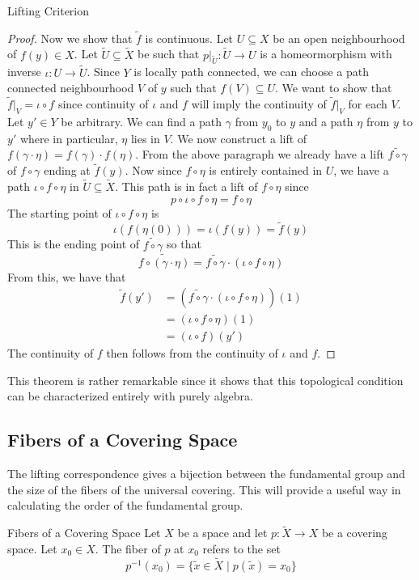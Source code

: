 \documentclass[a4paper]{article}
\begin{document}
\begin{thm}{Lifting Criterion}{}
\begin{proof}
Now we show that $\tilde{f}$ is continuous. Let $U\subseteq X$ be an open neighbourhood of $f(y)\in X$. Let $\tilde{U}\subseteq\tilde{X}$ be such that $p|_{\tilde{U}}:\tilde{U}\to U$ is a homeormorphism with inverse $\iota:U\to\tilde{U}$. Since $Y$ is locally path connected, we can choose a path connected neighbourhood $V$ of $y$ such that $f(V)\subseteq U$. We want to show that $\tilde{f}|_V=\iota\circ f$ since continuity of $\iota$ and $f$ will imply the continuity of $\tilde{f}|_V$ for each $V$. Let $y'\in Y$ be arbitrary. We can find a path $\gamma$ from $y_0$ to $y$ and a path $\eta$ from $y$ to $y'$ where in particular, $\eta$ lies in $V$. We now construct a lift of $f(\gamma\cdot\eta)=f(\gamma)\cdot f(\eta)$. From the above paragraph we already have a lift $\widetilde{f\circ\gamma}$ of $f\circ\gamma$ ending at $\tilde{f}(y)$. Now since $f\circ\eta$ is entirely contained in $U$, we have a path $\iota\circ f\circ\eta$ in $\tilde{U}\subseteq\tilde{X}$. This path is in fact a lift of $f\circ\eta$ since $$p\circ\iota\circ f\circ\eta=f\circ\eta$$ The starting point of $\iota\circ f\circ\eta$ is $$\iota(f(\eta(0)))=\iota(f(y))=\tilde{f}(y)$$ This is the ending point of $\tilde{f\circ\gamma}$ so that $$\widetilde{f\circ(\gamma\cdot\eta)}=\widetilde{f\circ\gamma}\cdot(\iota\circ f\circ\eta)$$ From this, we have that 
\begin{align*}
\tilde{f}(y')&=\left(\widetilde{f\circ\gamma}\cdot(\iota\circ f\circ\eta)\right)(1)\\
&=\left(\iota\circ f\circ\eta\right)(1)\\
&=(\iota\circ f)(y')
\end{align*}
The continuity of $f$ then follows from the continuity of $\iota$ and $f$. 
\end{proof}
\end{thm}

This theorem is rather remarkable since it shows that this topological condition can be characterized entirely with purely algebra. 

\subsection{Fibers of a Covering Space}
The lifting correspondence gives a bijection between the fundamental group and the size of the fibers of the universal covering. This will provide a useful way in calculating the order of the fundamental group. 

\begin{defn}{Fibers of a Covering Space}{} Let $X$ be a space and let $p:\tilde{X}\to X$ be a covering space. Let $x_0\in X$. The fiber of $p$ at $x_0$ refers to the set $$p^{-1}(x_0)=\{\tilde{x}\in\tilde{X}\;|\;p(\tilde{x})=x_0\}$$
\end{defn}
\end{document}

